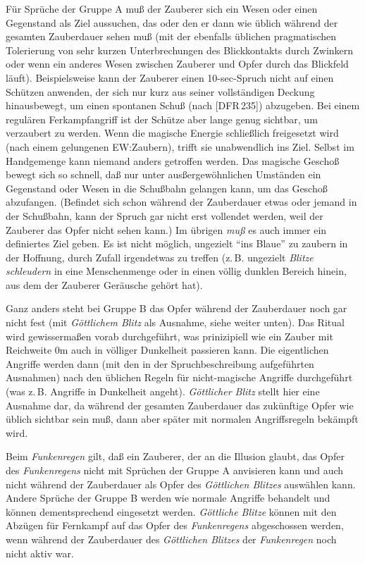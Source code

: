 \documentclass[10pt,a4paper,germanpar]{article}
\begin{document}
Für Sprüche der Gruppe A muß der Zauberer sich ein Wesen oder einen
Gegenstand als Ziel aussuchen, das oder den er dann wie üblich während
der gesamten Zauberdauer sehen muß (mit der ebenfalls üblichen
pragmatischen Tolerierung von sehr kurzen Unterbrechungen des
Blickkontakts durch Zwinkern oder wenn ein anderes Wesen zwischen
Zauberer und Opfer durch das Blickfeld läuft). Beispielsweise kann der
Zauberer einen 10-sec-Spruch nicht auf einen Schützen anwenden, der
sich nur kurz aus seiner vollständigen Deckung hinausbewegt, um einen
spontanen Schuß (nach [DFR\,235]) abzugeben. Bei einem regulären
Ferkampfangriff ist der Schütze aber lange genug sichtbar, um
verzaubert zu werden. Wenn die magische Energie schließlich
freigesetzt wird (nach einem gelungenen EW:Zaubern), trifft sie
unabwendlich ins Ziel. Selbst im Handgemenge kann niemand anders
getroffen werden. Das magische Geschoß bewegt sich so schnell, daß nur
unter ausßergewöhnlichen Umständen ein Gegenstand oder Wesen in die
Schußbahn gelangen kann, um das Geschoß abzufangen. (Befindet sich
schon während der Zauberdauer etwas oder jemand in der Schußbahn, kann
der Spruch gar nicht erst vollendet werden, weil der Zauberer das
Opfer nicht sehen kann.) Im übrigen \emph{muß} es auch immer ein
definiertes Ziel geben. Es ist nicht möglich, ungezielt "`ins Blaue"'
zu zaubern in der Hoffnung, durch Zufall irgendetwas zu treffen
(z.\,B. ungezielt \emph{Blitze schleudern} in eine Menschenmenge
oder in einen völlig dunklen Bereich hinein, aus dem der
Zauberer Geräusche gehört hat).

Ganz anders steht bei Gruppe B das Opfer während der Zauberdauer noch
gar nicht fest (mit \emph{Göttlichem Blitz} als Ausnahme, siehe weiter
unten). Das Ritual wird gewissermaßen vorab durchgeführt, was
prinizipiell wie ein Zauber mit Reichweite 0m auch in völliger
Dunkelheit passieren kann. Die eigentlichen Angriffe werden dann (mit
den in der Spruchbeschreibung aufgeführten Ausnahmen) nach den
üblichen Regeln für nicht-magische Angriffe durchgeführt (was
z.\,B. Angriffe in Dunkelheit angeht). \emph{Göttlicher Blitz} stellt
hier eine Ausnahme dar, da während der gesamten Zauberdauer das
zukünftige Opfer wie üblich sichtbar sein muß, dann aber später mit
normalen Angriffsregeln bekämpft wird.

Beim \emph{Funkenregen} gilt, daß ein Zauberer, der an die Illusion
glaubt, das Opfer des \emph{Funkenregens} nicht mit Sprüchen der
Gruppe A anvisieren kann und auch nicht während der Zauberdauer als
Opfer des \emph{Göttlichen Blitzes} auswählen kann. Andere Sprüche der
Gruppe B werden wie normale Angriffe behandelt und können
dementsprechend eingesetzt werden. \emph{Göttliche Blitze} können mit
den Abzügen für Fernkampf auf das Opfer des \emph{Funkenregens}
abgeschossen werden, wenn während der Zauberdauer des \emph{Göttlichen
  Blitzes} der \emph{Funkenregen} noch nicht aktiv war.
\end{document}
